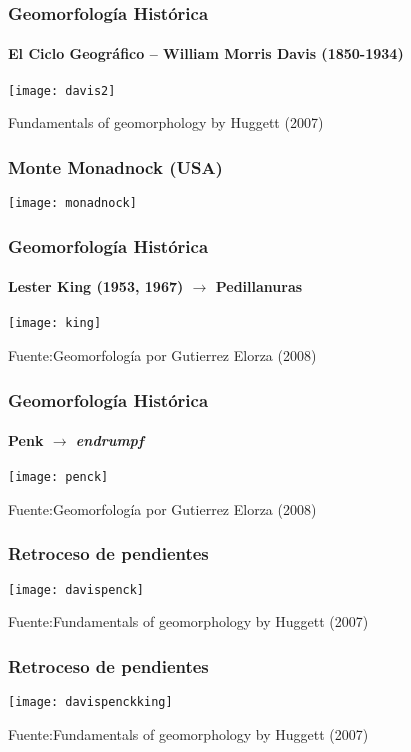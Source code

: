 \documentclass[]{beamer}
\begin{document}
\begin{frame}
\frametitle{Geomorfología Histórica}
\framesubtitle{El Ciclo Geográfico – William Morris Davis (1850-1934)}
\begin{center}
\texttt{[image: davis2]}
\end{center}
\tiny{Fundamentals of geomorphology by Huggett (2007)}
\end{frame}
\begin{frame}
\frametitle{Monte Monadnock (USA)}
\begin{center}
\texttt{[image: monadnock]}
\end{center}
\end{frame}
\begin{frame}
\frametitle{Geomorfología Histórica}
\framesubtitle{Lester King (1953, 1967) $\rightarrow$ Pedillanuras}
\begin{center}
\texttt{[image: king]}
\end{center}
\tiny{Fuente:Geomorfología por Gutierrez Elorza (2008)}
\end{frame}
\begin{frame}
\frametitle{Geomorfología Histórica}
\framesubtitle{Penk $\rightarrow$ \emph{endrumpf}}
\begin{center}
\texttt{[image: penck]}
\end{center}
\tiny{Fuente:Geomorfología por Gutierrez Elorza (2008)}
\end{frame}
\begin{frame}
\frametitle{Retroceso de pendientes}
\begin{center}
\texttt{[image: davispenck]}
\end{center}
\tiny{Fuente:Fundamentals of geomorphology by Huggett (2007)}
\end{frame}
\begin{frame}
\frametitle{Retroceso de pendientes}
\begin{center}
\texttt{[image: davispenckking]}
\end{center}
\tiny{Fuente:Fundamentals of geomorphology by Huggett (2007)}
\end{frame}
\end{document}
